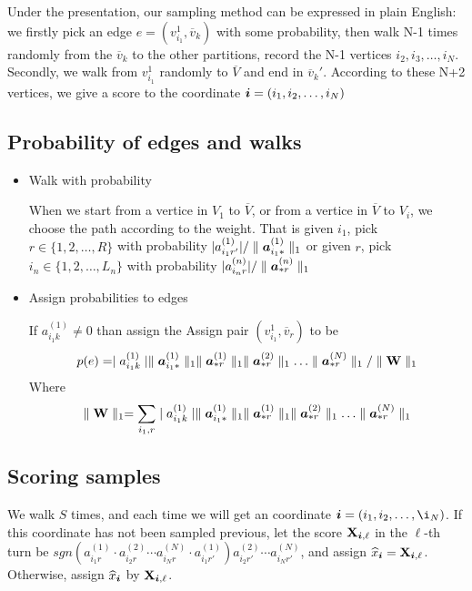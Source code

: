 \documentclass{article}
\newcommand{\Sca}[3]{{#1}^{(#2)}_{i_#2#3}}%
\newcommand{\V}[1]{{\bm{{\MakeLowercase{#1}}}}}%
\newcommand{\Varow}[1]{\V{a}^{(#1)}_{i_#1*}}
\newcommand{\Vacol}[1]{\V{a}^{(#1)}_{*r}}
\newcommand{\M}[1]{{\bm{\mathbf{\MakeUppercase{#1}}}}}%
\newcommand{\norm}[2]{\parallel#1\parallel_{#2}}
\begin{document}
Under the presentation, our sampling method can be expressed in plain English: we firstly pick an edge $e=(v^1_{i_1},\overline{v}_k)$ with some probability, then walk N-1 times randomly from the $\overline{v}_k$ to the other partitions, record the N-1 vertices $i_2,i_3,\ldots,i_N$. Secondly, we walk from $v^1_{i_1}$ randomly to $\overline{V}$ and end in $\overline{v}_k'$. According to these N+2 vertices, we give a score to the coordinate $\V{i}=(i_1,i_2,\ldots,i_N)$

\subsection{Probability of edges and walks}

\begin{itemize}
  \item Walk with probability

  When we start from a vertice in $V_1$ to $\overline{V}$, or from a vertice in $\overline{V}$ to $V_i$, we choose the path according to the weight. That is given $i_1$, pick $r\in\{1,2,\ldots,R\}$ with probability $|\Sca{a}{1}{r'}|/\norm{\Varow{1}}{1}$ or given $r$, pick $i_n\in\{1,2,\ldots,L_n\}$ with probability $|\Sca{a}{n}{r}|/\norm{\Vacol{n}}{1}$

  \item Assign probabilities to  edges

  If $ \Sca{a}{1}{k} \neq 0 $ than assign the
  Assign pair $(v^1_{i_1},\overline{v}_r)$ to be
  \[
    p(e) = \mid\Sca{a}{1}{k}\mid \norm{\Varow{1}}{1} \norm{\Vacol{1}}{1} \norm{\Vacol{2}}{1} \ldots \norm{\Vacol{N}}{1} / \norm{\M{W}}{1}
  \]
  Where
  \[
    \norm{\M{W}}{1} = \sum_{i_1,r}\mid \Sca{a}{1}{k}\mid \norm{\Varow{1}}{1} \norm{\Vacol{1}}{1} \norm{\Vacol{2}}{1} \ldots \norm{\Vacol{N}}{1}
  \]

\end{itemize}

\subsection{Scoring samples}

We walk $S$ times, and each time we will get an coordinate $\V{i} = (i_1,i_2,\ldots,\i_N) $. If this coordinate has not been sampled previous, let the score
$ \M{X}_{\V{i},\ell} $ in the $\ell $-th turn be
$ sgn(\Sca{a}{1}{r}\cdot\Sca{a}{2}{r}\cdots\Sca{a}{N}{r}\cdot\Sca{a}{1}{r'})
\Sca{a}{2}{r'}\cdots\Sca{a}{N}{r'} $,
and assign $\widehat{x}_{\V{i}} = \M{X}_{\V{i},\ell}$. Otherwise, assign $\widehat{x}_{\V{i}}$ by $\M{X}_{\V{i},\ell}$.
\end{document}

